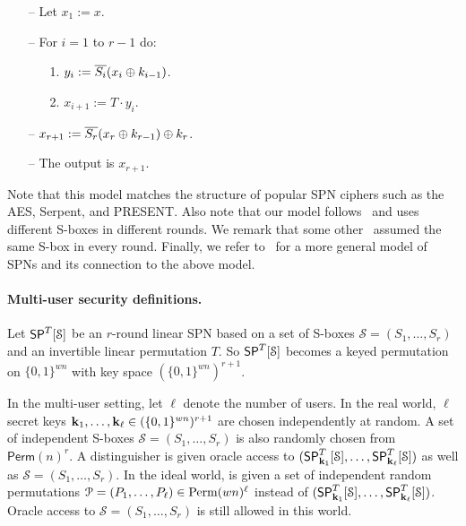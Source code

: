 \documentclass[journal=tosc,final,nohyperref]{iacrtrans}
\begin{document}
\begin{itemize}
	\item[--]
	Let $x_1 := x$.
	\item[--]
	For $i = 1$ to $r-1$ do:
	\begin{itemize}
		\item[1.] $y_{i} := \overline{S_i}(x_{i}\oplus k_{i-1})$.
		\item[2.] 
		$x_{i + 1} := T\cdot y_i$.
	\end{itemize}
	\item[--] $x_{r+1} := \overline{S_r}(x_r\oplus k_{r-1})\oplus k_r$.
	\item[--]
	The output is $x_{r+1}$.
\end{itemize}

Note that this model matches the structure of popular SPN ciphers such as the AES, Serpent, and PRESENT. Also note that our model follows~\cite[Sect. 4.2]{C:CDKLST18} and uses different S-boxes in different rounds. We remark that some other~\cite[Sect. 3]{C:CDKLST18} assumed the same S-box in every round. Finally, we refer to~\cite[Sect. 2.1]{EPRINT:DKSTZ17} for a more general model of SPNs and its connection to the above model.











%

\paragraph{Multi-user security definitions.}


Let $\mathsf{SP}^T[\mathcal{S}]$ be an $r$-round linear SPN based on a set of S-boxes $\mathcal{S}=(S_1, \ldots  ,S_r)$ and an invertible linear permutation $T$. So $\mathsf{SP}^T[\mathcal{S}]$
becomes a keyed permutation on $\{0, 1\}^{wn}$ with key space $(\{0,1\}^{wn})^{r+1}$.


In the multi-user setting, let $\ell$ denote the number of users. In the real
world, $\ell$ secret keys $\mathbf{k}_1,\ldots,\mathbf{k}_\ell\in(\{0,1\}^{wn})^{r+1}$ are chosen independently at random.
A set of independent S-boxes $\mathcal{S}=(S_1,\ldots,S_r)$ is also randomly chosen from $\textsf{Perm}(n)^r$. A distinguisher \dis is given oracle access to $(\mathsf{SP}_{\mathbf{k}_1}^T[\mathcal{S}],\ldots,\mathsf{SP}_{\mathbf{k}_\ell}^T[\mathcal{S}])$ as
well as $\mathcal{S}=(S_1,\ldots,S_r)$. In the ideal world, \dis is given a set of independent
random permutations ${\mathcal{P}}=({P}_1,\ldots,{P}_{\ell})\in{\operatorname{Perm}}(wn)^\ell$ instead of $(\mathsf{SP}_{\mathbf{k}_1}^T[\mathcal{S}],\ldots,\mathsf{SP}_{\mathbf{k}_\ell}^T[\mathcal{S}])$. Oracle access to $\mathcal{S}=(S_1,\ldots,S_r)$ is still allowed in this world.
\end{document}
